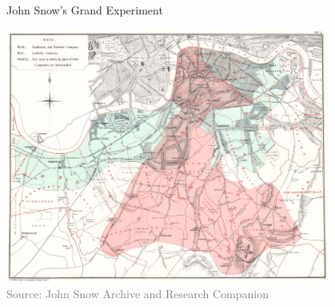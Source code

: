 \documentclass[10pt,xcolor=table,ignorenonframetext,handout,aspectratio=169]{beamer}
\begin{document}
\begin{frame}{John Snow's Grand Experiment}

\medskip
\begin{center}
	\includegraphics[width=0.8\textwidth]{img/snow-map-complete.jpg} \\
	\vspace{-0.2cm}
	{\textcolor{gray}{\tiny Source:  John Snow Archive and Research Companion}}
\end{center}

\end{frame}


\end{document}
